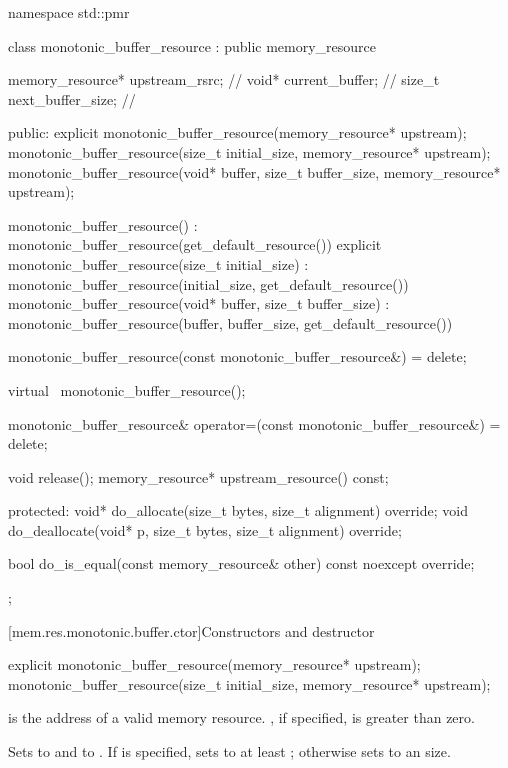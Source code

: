 %
\begin{codeblock}
namespace std::pmr {
  class monotonic_buffer_resource : public memory_resource {
    memory_resource* upstream_rsrc;     // \expos
    void* current_buffer;               // \expos
    size_t next_buffer_size;            // \expos

  public:
    explicit monotonic_buffer_resource(memory_resource* upstream);
    monotonic_buffer_resource(size_t initial_size, memory_resource* upstream);
    monotonic_buffer_resource(void* buffer, size_t buffer_size, memory_resource* upstream);

    monotonic_buffer_resource()
      : monotonic_buffer_resource(get_default_resource()) {}
    explicit monotonic_buffer_resource(size_t initial_size)
      : monotonic_buffer_resource(initial_size, get_default_resource()) {}
    monotonic_buffer_resource(void* buffer, size_t buffer_size)
      : monotonic_buffer_resource(buffer, buffer_size, get_default_resource()) {}

    monotonic_buffer_resource(const monotonic_buffer_resource&) = delete;

    virtual ~monotonic_buffer_resource();

    monotonic_buffer_resource& operator=(const monotonic_buffer_resource&) = delete;

    void release();
    memory_resource* upstream_resource() const;

  protected:
    void* do_allocate(size_t bytes, size_t alignment) override;
    void do_deallocate(void* p, size_t bytes, size_t alignment) override;

    bool do_is_equal(const memory_resource& other) const noexcept override;
  };
}
\end{codeblock}

[mem.res.monotonic.buffer.ctor]{Constructors and destructor}

%
\begin{itemdecl}
explicit monotonic_buffer_resource(memory_resource* upstream);
monotonic_buffer_resource(size_t initial_size, memory_resource* upstream);
\end{itemdecl}

\begin{itemdescr}
\pnum
\expects
{} is the address of a valid memory resource.
, if specified, is greater than zero.

\pnum
\effects
Sets  to  and
 to .
If  is specified,
sets  to at least ;
otherwise sets  to an
 size.
\end{itemdescr}

